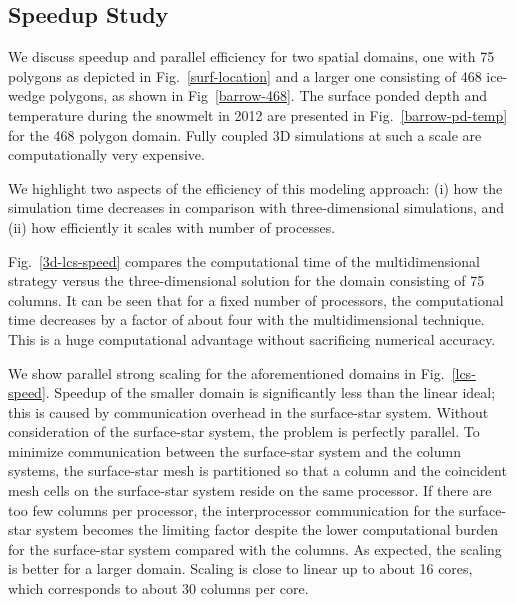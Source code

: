 \documentclass[review]{elsarticle}
\begin{document}

\subsection{Speedup Study}
We discuss speedup and parallel efficiency for two spatial domains, one with 75 polygons as depicted in Fig.~\ref{surf-location} and a larger one consisting of 468 ice-wedge polygons, as shown in Fig~\ref{barrow-468}. The surface ponded depth and temperature during the snowmelt in 2012 are presented in Fig.~\ref{barrow-pd-temp} for the 468 polygon domain. Fully coupled 3D simulations at such a scale are computationally very expensive.

We highlight two aspects of the efficiency of this modeling approach: (i) how the simulation time decreases in comparison with three-dimensional simulations, and (ii) how efficiently it scales with number of processes. 

Fig.~\ref{3d-lcs-speed} compares the computational time of the multidimensional strategy versus the three-dimensional solution for the domain consisting of 75 columns. 
It can be seen that for a fixed number of processors, the computational time decreases by a factor of about four with the multidimensional technique. This is a huge computational advantage without sacrificing numerical accuracy. 

We show parallel strong scaling for the aforementioned domains in Fig.~\ref{lcs-speed}. Speedup of the smaller domain is significantly less than the linear ideal; this is caused by communication overhead in the surface-star system. Without consideration of the surface-star system, the problem is perfectly parallel. To minimize communication between the surface-star system and the column systems, the surface-star mesh is partitioned so that a column and the coincident mesh cells on the surface-star system reside on the same processor. If there are too few columns per processor, the interprocessor communication for the surface-star system becomes the limiting factor despite the lower computational burden for the surface-star system compared with the columns. 
As expected, the scaling is better for a larger domain. Scaling is close to linear up to about 16 cores, which corresponds to about 30 columns per core. 
\end{document}
